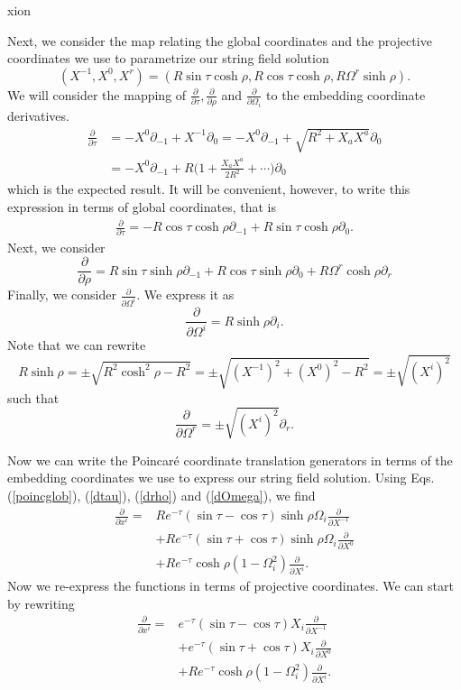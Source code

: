 xion\documentclass[12pt]{article}
\def\be{\begin{equation}}
\def\ee{\end{equation}}
\numberwithin{equation}{section}
\begin{document}
Next, we consider the map relating the global coordinates and the projective coordinates we use to parametrize our string field solution
\be
    (X^{-1},X^{0},X^{r})=(R\sin{\tau}\cosh{\rho},R\cos{\tau}\cosh{\rho},R\Omega^r\sinh{\rho}).
\ee
We will consider the mapping of $\frac{\partial}{\partial\tau}, \frac{\partial}{\partial\rho}$ and $\frac{\partial}{\partial\Omega_i}$ to the embedding coordinate derivatives.
\be
\begin{split}
    \frac{\partial}{\partial\tau}&=-X^0\partial_{-1}+X^{-1}\partial_0=-X^0\partial_{-1}+\sqrt{R^2+X_aX^a}\partial_0\\
    &=-X^0\partial_{-1}+R\Big(1+\frac{X_aX^a}{2R^2}+\cdots\Big)\partial_0
\end{split}
\ee
which is the expected result. It will be convenient, however, to write this expression in terms of global coordinates, that is
\be \label{dtau}
\begin{split}
    \frac{\partial}{\partial\tau}=-R\cos{\tau}\cosh{\rho}\partial_{-1}+R\sin{\tau}\cosh{\rho}\partial_0.
\end{split}
\ee
Next, we consider
\be \label{drho}
    \frac{\partial}{\partial\rho}=R\sin{\tau}\sinh{\rho}\partial_{-1}+R\cos{\tau}\sinh{\rho}\partial_0+R\Omega^r\cosh{\rho}\partial_r
\ee
Finally, we consider $\frac{\partial}{\partial\Omega^i}$. We express it as
\be \label{dOmega}
    \frac{\partial}{\partial\Omega^i}=R\sinh{\rho}\partial_i.
\ee
Note that we can rewrite
\be
    R\sinh{\rho}=\pm\sqrt{R^2\cosh^2{\rho}-R^2}=\pm\sqrt{(X^{-1})^2+(X^0)^2-R^2}=\pm\sqrt{(X^i)^2}
\ee
such that
\be
    \frac{\partial}{\partial\Omega^r}=\pm\sqrt{(X^{i})^{2}}\partial_r.
\ee

Now we can write the Poincaré coordinate translation generators in terms of the embedding coordinates we use to express our string field solution. Using Eqs. (\ref{poincglob}), (\ref{dtau}), (\ref{drho}) and (\ref{dOmega}), we find
\begin{equation}
\begin{split}
    \frac{\partial}{\partial x^i}=&Re^{-\tau}(\sin{\tau}-\cos{\tau})\sinh{\rho}\Omega_i\frac{\partial}{\partial X^{-1}}\\
    &+Re^{-\tau}(\sin{\tau}+\cos{\tau})\sinh{\rho}\Omega_i\frac{\partial}{\partial X^0}\\
    &+Re^{-\tau}\cosh{\rho}(1-\Omega_i^2)\frac{\partial}{\partial X^i}.
\end{split}
\end{equation}
Now we re-express the functions in terms of projective coordinates. We can start by rewriting
\begin{equation}
\begin{split}
    \frac{\partial}{\partial x^i}=&e^{-\tau}(\sin{\tau}-\cos{\tau})X_{i}\frac{\partial}{\partial X^{-1}}\\
    &+e^{-\tau}(\sin{\tau}+\cos{\tau})X_{i}\frac{\partial}{\partial X^0}\\
    &+Re^{-\tau}\cosh{\rho}(1-\Omega_i^2)\frac{\partial}{\partial X^i}.
\end{split}
\end{equation}
\end{document}

